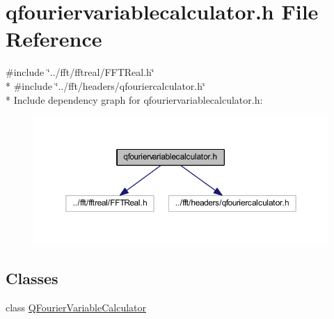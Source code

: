 \hypertarget{a00124}{\section{qfouriervariablecalculator.\+h File Reference}
\label{a00124}
}
{\ttfamily \#include \char`\"{}../fft/fftreal/\+F\+F\+T\+Real.\+h\char`\"{}}\\*
{\ttfamily \#include \char`\"{}../fft/headers/qfouriercalculator.\+h\char`\"{}}\\*
Include dependency graph for qfouriervariablecalculator.\+h\+:
\nopagebreak
\begin{figure}[H]
\begin{center}
\leavevmode
\includegraphics[width=350pt]{da/d75/a00334}
\end{center}
\end{figure}
\subsection*{Classes}
\begin{DoxyCompactItemize}
\item 
class \hyperlink{a00055}{Q\+Fourier\+Variable\+Calculator}
\end{DoxyCompactItemize}

